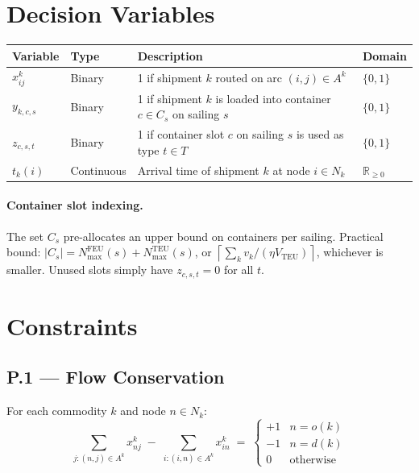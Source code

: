 \documentclass[11pt,a4paper]{article}
\newcommand{\ceil}[1]{\left\lceil #1 \right\rceil}
\theoremstyle{definition}
\begin{document}
\section{Decision Variables}

\begin{center}
\begin{tabular}{llp{7cm}l}
\toprule
Variable & Type & Description & Domain \\
\midrule
$x_{ij}^k$ & Binary & 1 if shipment $k$ routed on arc $(i,j) \in A^k$ & $\{0, 1\}$ \\
$y_{k,c,s}$ & Binary & 1 if shipment $k$ is loaded into container $c \in C_s$ on sailing $s$ & $\{0, 1\}$ \\
$z_{c,s,t}$ & Binary & 1 if container slot $c$ on sailing $s$ is used as type $t \in T$ & $\{0, 1\}$ \\
$t_k(i)$ & Continuous & Arrival time of shipment $k$ at node $i \in N_k$ & $\mathbb{R}_{\geq 0}$ \\
\bottomrule
\end{tabular}
\end{center}

\paragraph{Container slot indexing.}
The set $C_s$ pre-allocates an upper bound on containers per sailing. Practical bound:
$|C_s| = N_{\max}^{\text{FEU}}(s) + N_{\max}^{\text{TEU}}(s)$, or $\ceil{\sum_k v_k / (\eta V_{\text{TEU}})}$,
whichever is smaller. Unused slots simply have $z_{c,s,t} = 0$ for all $t$.

\section{Constraints}

\subsection*{P.1 — Flow Conservation}

For each commodity $k$ and node $n \in N_k$:
\begin{equation}
  \sum_{j : (n,j) \in A^k} x_{nj}^k \;-\; \sum_{i : (i,n) \in A^k} x_{in}^k
  \;=\;
  \begin{cases}
    +1 & n = o(k) \\
    -1 & n = d(k) \\
    0  & \text{otherwise}
  \end{cases}
  \label{eq:lcl-P1}
\end{equation}
\end{document}
